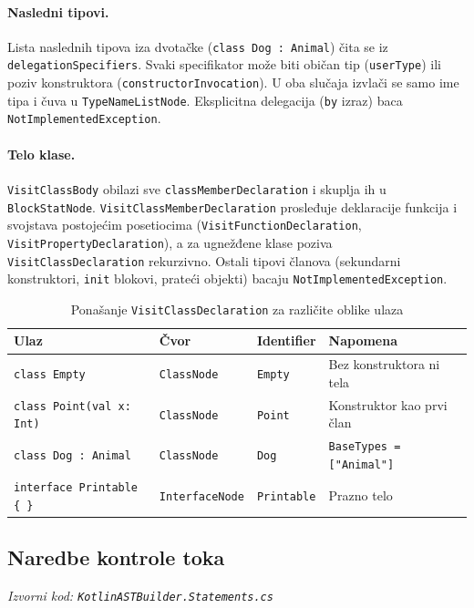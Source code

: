 \documentclass[a4paper]{article}
\begin{document}
\paragraph{Nasledni tipovi.}
Lista naslednih tipova iza dvotačke (\texttt{class Dog : Animal}) čita se iz
\texttt{delegationSpecifiers}. Svaki specifikator može biti običan tip
(\texttt{userType}) ili poziv konstruktora (\texttt{constructorInvocation}). U
oba slučaja izvlači se samo ime tipa i čuva u \texttt{TypeNameListNode}.
Eksplicitna delegacija (\texttt{by} izraz) baca \texttt{NotImplementedException}.

\paragraph{Telo klase.}
\texttt{VisitClassBody} obilazi sve \texttt{classMemberDeclaration} i skuplja ih
u \texttt{BlockStatNode}. \texttt{VisitClassMemberDeclaration} prosleđuje
deklaracije funkcija i svojstava postojećim posetiocima
\newline
(\texttt{VisitFunctionDeclaration}, \texttt{VisitPropertyDeclaration}), a za
ugnežđene klase poziva \texttt{VisitClassDeclaration} rekurzivno. Ostali
tipovi članova (sekundarni konstruktori, \texttt{init} blokovi, prateći objekti)
\newline
bacaju \texttt{NotImplementedException}.

\begin{table}[H]
\centering
\begin{tabularx}{\textwidth}{lllX}
\toprule
\textbf{Ulaz} & \textbf{Čvor} & \textbf{Identifier} & \textbf{Napomena} \\
\midrule
\texttt{class Empty} &
    \texttt{ClassNode} & \texttt{Empty} &
    Bez konstruktora ni tela \\
\texttt{class Point(val x: Int)} &
    \texttt{ClassNode} & \texttt{Point} &
    Konstruktor kao prvi član \\
\texttt{class Dog : Animal} &
    \texttt{ClassNode} & \texttt{Dog} &
    \texttt{BaseTypes = ["Animal"]} \\
\texttt{interface Printable \{ \}} &
    \texttt{InterfaceNode} & \texttt{Printable} &
    Prazno telo \\
\bottomrule
\end{tabularx}
\caption{Ponašanje \texttt{VisitClassDeclaration} za različite oblike ulaza}
\end{table}

\subsection{Naredbe kontrole toka}
\noindent\textit{Izvorni kod: \texttt{KotlinASTBuilder.Statements.cs}}
\end{document}
